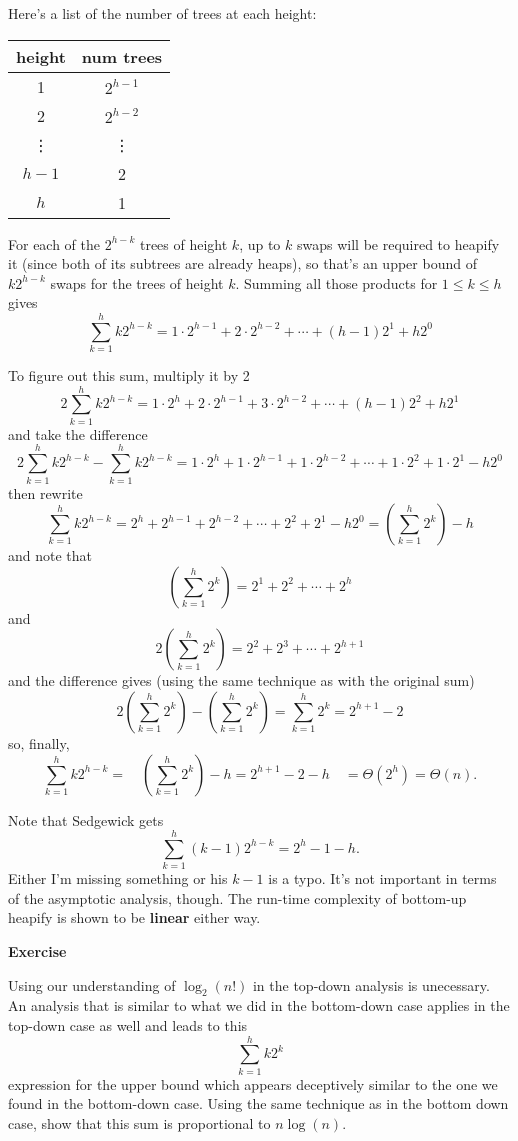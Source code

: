 \documentclass{article}
\begin{document}
\vspace{1pc}
Here's a list of the number of trees at each height:
\begin{center}
\begin{tabular}{c|c}
height  & num trees \\
\hline
 1      & $2^{h-1}$ \\
 2      & $2^{h-2}$ \\
 \vdots & \vdots    \\
 $h-1$  & 2         \\
 $h$    & 1         \\
\end{tabular}
\end{center}

For each of the $2^{h-k}$ trees of height $k$, up to $k$ swaps will be required
to heapify it (since both of its subtrees are already heaps), so that's an
upper bound of $k2^{h-k}$ swaps for the trees of height $k$. Summing all those
products for
$1\le k\le h$ gives
\[
  \sum_{k=1}^{h} k2^{h-k}
=
  1\cdot2^{h-1} + 2\cdot2^{h-2} + \cdots + (h-1)2^1 + h2^0
\]

To figure out this sum, multiply it by 2
\[
  2\sum_{k=1}^{h} k2^{h-k}
=
  1\cdot2^{h} + 2\cdot2^{h-1} + 3\cdot2^{h-2} + \cdots + (h-1)2^2 + h2^1
\]
and take the difference
\[
  2\sum_{k=1}^{h} k2^{h-k}
-
  \sum_{k=1}^{h} k2^{h-k}
=
  1\cdot2^{h} + 1\cdot2^{h-1} + 1\cdot2^{h-2} + \cdots + 1\cdot2^2 + 1\cdot2^1 - h2^0
\]
then rewrite
\[
  \sum_{k=1}^{h} k2^{h-k}
=
  2^{h} + 2^{h-1} + 2^{h-2} + \cdots + 2^2 + 2^1 - h2^0
=
  \left(\sum_{k=1}^{h} 2^{k}\right) - h
\]
and note that
\[
  \left(\sum_{k=1}^{h} 2^{k}\right)
= 
  2^1 + 2^2 + \cdots + 2^h
\]
and
\[
  2\left(\sum_{k=1}^{h} 2^{k}\right)
= 
  2^2 + 2^3 + \cdots + 2^{h+1}
\]
and the difference gives (using the same technique as with the original sum)
\[
  2\left(\sum_{k=1}^{h} 2^{k}\right)
  -\left(\sum_{k=1}^{h} 2^{k}\right)
=
  \sum_{k=1}^{h} 2^{k}
=
  2^{h+1} - 2
\]
so, finally,
\[
  \sum_{k=1}^{h} k2^{h-k}
=
\quad
  \left(\sum_{k=1}^{h} 2^{k}\right) - h
=
  2^{h+1} - 2 - h
\quad
=
  \Theta(2^h)
=
  \Theta(n).
\]

Note that Sedgewick gets
\[
  \sum_{k=1}^{h} (k-1)2^{h-k}
=
  2^{h} - 1 - h.
\]
Either I'm missing something or his $k-1$ is a typo.
It's not important in terms of the asymptotic analysis, though.
The run-time complexity of bottom-up heapify is shown to be \textbf{linear}
either way.

\vspace{1pc}
{\large\bf Exercise}

Using our understanding of $\log_2(n!)$ in the top-down analysis is unecessary.
An analysis that is similar to what we did in the bottom-down case applies in
the top-down case as well and leads to
this
\[
  \sum_{k=1}^{h} k2^k
\]
expression for the upper bound which appears deceptively similar to the one we
found in the bottom-down case. Using the same technique as in the bottom down
case, show that this sum is proportional to $n\log(n)$.
\end{document}
